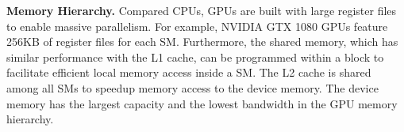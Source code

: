 \vspace{1mm}\noindent\textbf{Memory Hierarchy.} Compared CPUs, GPUs are built with large register files to enable massive parallelism. 
For example, NVIDIA GTX 1080 GPUs feature 256KB of register files for each SM. Furthermore, the shared memory, which has similar performance with the L1 cache, can be programmed within a block to facilitate efficient local memory access inside a SM.
The L2 cache is shared among all SMs to speedup memory access to the device memory. The device memory has the largest capacity and the lowest bandwidth in the GPU memory hierarchy.



